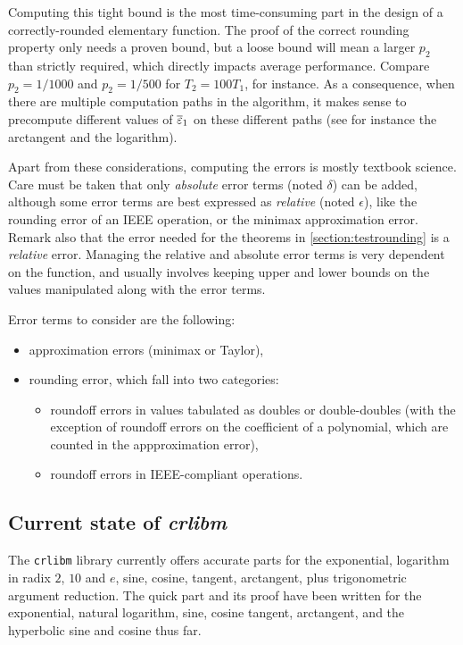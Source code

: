 Computing this tight bound is the most time-consuming part in the
design of a correctly-rounded elementary function. The proof of the
correct rounding property only needs a proven bound, but a loose bound
will mean a larger $p_2$ than strictly required, which directly
impacts average performance. Compare $p_2=1/1000$ and $p_2=1/500$ for
$T_2=100T_1$, for instance. As a consequence, when there are multiple
computation paths in the algorithm, it makes sense to precompute
different values of ${\overline{\varepsilon}}_1$ on these different paths (see for
instance the arctangent and the logarithm).






Apart from these considerations, computing the errors is mostly
textbook science. Care must be taken that only \emph{absolute} error terms
(noted $\delta$) can be added, although some error terms are best
expressed as \emph{relative} (noted $\epsilon$), like the rounding
error of an IEEE operation, or the minimax approximation error. Remark
also that the error needed for the theorems in
\ref{section:testrounding} is a \emph{relative} error.  Managing the
relative and absolute error terms is very dependent on the function,
and usually involves keeping upper and lower bounds on the values
manipulated along with the error terms.

Error terms to consider are the following:
\begin{itemize}
\item approximation errors  (minimax or Taylor),
\item rounding error, which fall into two categories:
  \begin{itemize}
  \item roundoff errors in values tabulated as doubles or
    double-doubles (with the exception of roundoff errors on the coefficient
    of a polynomial, which are counted in the appproximation error),
  \item roundoff errors in IEEE-compliant operations.
  \end{itemize}
\end{itemize}



\subsection{Current state of \emph{crlibm} 
\label{sec:current-state} }

The \texttt{crlibm} library currently offers accurate parts for the exponential,
logarithm in radix $2$, $10$ and $e$, sine, cosine, tangent,
arctangent, plus trigonometric argument reduction. The quick part and
its proof have been written for the exponential, natural logarithm,
sine, cosine tangent, arctangent, and the hyperbolic sine and cosine
thus far.

